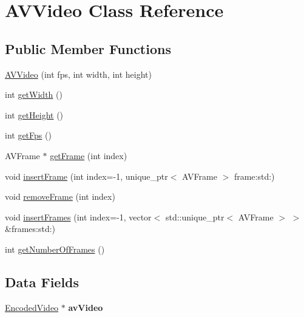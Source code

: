 \hypertarget{classAVVideo}{}\section{A\+V\+Video Class Reference}
\label{classAVVideo}
\subsection*{Public Member Functions}
\begin{DoxyCompactItemize}
\item 
\hyperlink{classAVVideo_af6a4a9766b45d8b9a6c10f0b6c5d8998}{A\+V\+Video} (int fps, int width, int height)
\item 
int \hyperlink{classAVVideo_a67a0997183f24da19b776d96c1052998}{get\+Width} ()
\item 
int \hyperlink{classAVVideo_a07efb2a4e9a982688c8bb3c3f21d1092}{get\+Height} ()
\item 
int \hyperlink{classAVVideo_a519ad5c0664b9de28c1a6d9dc77f959d}{get\+Fps} ()
\item 
A\+V\+Frame $\ast$ \hyperlink{classAVVideo_a5ae52bc55f8cdfa021eb1107beba5f61}{get\+Frame} (int index)
\item 
void \hyperlink{classAVVideo_ace104c676dbfe0dc570e75b8ed79c283}{insert\+Frame} (int index=-\/1, unique\+\_\+ptr$<$ A\+V\+Frame $>$ frame\+:std\+:)
\item 
void \hyperlink{classAVVideo_a2467a8d0c175fdcbacea59e9955d88a9}{remove\+Frame} (int index)
\item 
void \hyperlink{classAVVideo_af7a4bb4befc8330296b9765b4b23a7db}{insert\+Frames} (int index=-\/1, vector$<$ std\+::unique\+\_\+ptr$<$ A\+V\+Frame $>$ $>$ \&frames\+:std\+:)
\item 
int \hyperlink{classAVVideo_a038091d64aa83552571228512789d5ee}{get\+Number\+Of\+Frames} ()
\end{DoxyCompactItemize}
\subsection*{Data Fields}
\begin{DoxyCompactItemize}
\item 
\hypertarget{classAVVideo_ac9ed4508bb290cd37cf750452cec5161}{}\hyperlink{classEncodedVideo}{Encoded\+Video} $\ast$ {\bfseries av\+Video}\label{classAVVideo_ac9ed4508bb290cd37cf750452cec5161}

\end{DoxyCompactItemize}


